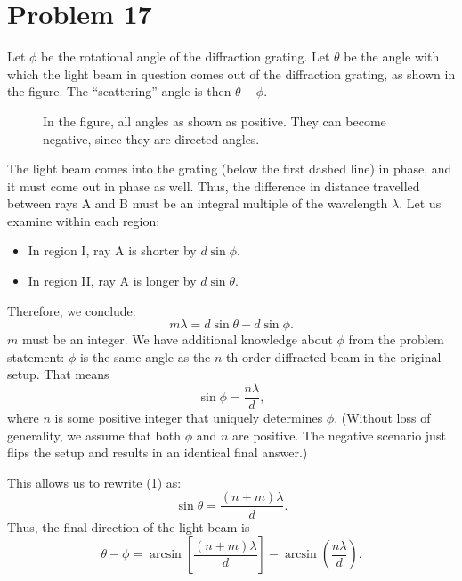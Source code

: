 \documentclass[12pt]{article}
\title{}
\date{}
\author{Jacob H. Nie}
\begin{document}
\section*{Problem 17}

Let $\phi$ be the rotational angle of the diffraction grating.  Let $\theta$ be the angle with which the light beam in question comes out of the diffraction grating, as shown in the figure.  The ``scattering'' angle is then $\theta - \phi$. 
\begin{figure}[ht]
	\centering
	\caption{In the figure, all angles as shown as positive.  They can become negative, since they are directed angles.}
\end{figure}

The light beam comes into the grating (below the first dashed line) in phase, and it must come out in phase as well.  Thus, the difference in distance travelled between rays A and B must be an integral multiple of the wavelength $\lambda$.  Let us examine within each region:

\begin{itemize}
	\item In region I, ray A is shorter by $d\sin \phi$. 
	\item In region II, ray A is longer by $d\sin\theta$.
\end{itemize}

Therefore, we conclude:
\begin{equation}
	m \lambda = d\sin \theta - d\sin \phi.
\end{equation}
$m$ must be an integer.  We have additional knowledge about $\phi$ from the problem statement: $\phi$ is the same angle as the $n$-th order diffracted beam in the original setup.  That means 
\[
	\sin \phi = \frac{n\lambda }{d},
\] 
where $n$ is some positive integer that uniquely determines $\phi$.  (Without loss of generality, we assume that both $\phi$ and $n$ are positive.  The negative scenario just flips the setup and results in an identical final answer.)

This allows us to rewrite (1) as:
\begin{equation}
	\sin \theta = \frac{(n+m)\lambda }{d}.
\end{equation}
Thus, the final direction of the light beam is
\begin{equation}
	\theta - \phi = \arcsin\left[ \frac{(n+m)\lambda }{d} \right] - \arcsin\left( \frac{n\lambda }{d} \right).
\end{equation}
\end{document}
